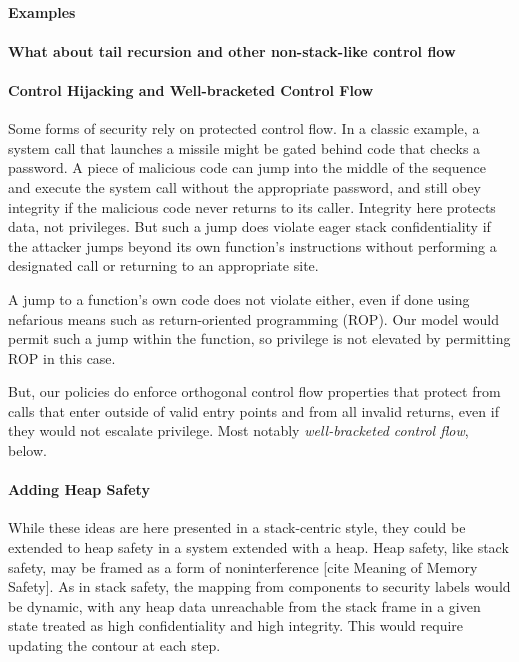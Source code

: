 \documentclass[acmsmall,review,anonymous]{acmart}\settopmatter{printfolios=true,printccs=false,printacmref=false}
\begin{document}
  \paragraph{Examples}


  \paragraph{What about tail recursion and other non-stack-like control flow}

  \paragraph{Control Hijacking and Well-bracketed Control Flow}
  
    Some forms of security rely on protected control flow. In a classic
    example, a system call that launches a missile might be gated behind code
    that checks a password. A piece of malicious code can jump into the middle
    of the sequence and execute the system call without the appropriate password,
    and still obey integrity if the malicious code never returns to its caller.
    Integrity here protects data, not privileges. But such a jump does violate
    eager stack confidentiality if the attacker jumps beyond its own function's
    instructions without performing a designated call or returning to an
    appropriate site.

    A jump to a function's own code does not violate either, even if done using
    nefarious means such as return-oriented programming (ROP). Our model would
    permit such a jump within the function, so privilege is not elevated by
    permitting ROP in this case.

    But, our policies do enforce orthogonal control flow properties that
    protect from calls that enter outside of valid entry points and from all
    invalid returns, even if they would not escalate privilege. Most notably
    {\em well-bracketed control flow}, below.

  \paragraph{Adding Heap Safety}

    While these ideas are here presented in a stack-centric style, they could
    be extended to heap safety in a system extended with a heap. Heap safety,
    like stack safety, may be framed as a form of noninterference
    [cite Meaning of Memory Safety]. As in stack safety, the mapping from
    components to security labels would be dynamic, with any heap data
    unreachable from the stack frame in a given state treated as high
    confidentiality and high integrity. This would require updating the contour
    at each step.
\end{document}
